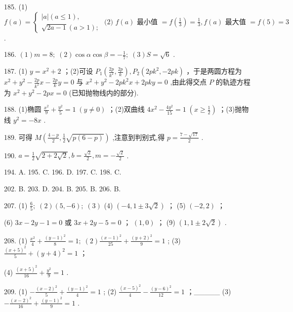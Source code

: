 \documentclass[10pt]{article}
\begin{document}
185. (1) \(f\left( a\right)  = \left\{  {\begin{array}{l} \left| a\right| \left( {a \leq  1}\right) , \\  \sqrt{{2a} - 1}\left( {a > 1}\right) ; \end{array}\text{ (2) }f\left( a\right) \text{ 最小值 } = f\left( \frac{1}{3}\right)  = \frac{1}{3},f\left( a\right) \text{ 最大值 } = f\left( 5\right)  = 3}\right.\) .

186. \(\left( 1\right) m = 8;\;\left( 2\right) \cos \alpha \cos \beta  =  - \frac{1}{7};\;\left( 3\right) S = \sqrt{6}\) .

187. (1) \(y = {x}^{2} + 2\) ；(2)可设 \({P}_{1}\left( {\frac{2p}{{k}^{2}},\frac{2p}{k}}\right) ,{P}_{2}\left( {{2p}{k}^{2}, - {2pk}}\right)\) ，于是两圆方程为 \({x}^{2} + {y}^{2} - \frac{2p}{{k}^{2}}x - \frac{2p}{k}y = 0\) 与 \({x}^{2} + {y}^{2} - {2p}{k}^{2}x + {2pky} = 0\) ,由此得交点 \(P\) 的轨迹方程为 \({x}^{2} + {y}^{2} - {2px} = 0\) (已知抛物线内的部分).

188. (1)椭圆 \(\frac{{x}^{2}}{9} + \frac{{y}^{2}}{5} = 1\;\left( {y \neq  0}\right)\) ；(2)双曲线 \(4{x}^{2} - \frac{4{y}^{2}}{15} = 1\;\left( {x \geq  \frac{1}{2}}\right)\) ；(3)抛物线 \({y}^{2} =  - {8x}\) .

189. 可得 \(M\left( {\frac{4 - p}{2},\frac{1}{2}\sqrt{p\left( {6 - p}\right) }}\right)\) ,注意到判别式,得 \(p = \frac{7 - \sqrt{17}}{2}\) .

190. \(a = \frac{1}{2}\sqrt{2 + 2\sqrt{2}},b = \frac{\sqrt{2}}{2},m =  - \frac{\sqrt{2}}{2}\) .

194. A. 195. C. 196. D. 197. C. 198. C.

202. B. 203. D. 204. B. 205. B. 206. B.

207. (1) \(\frac{6}{5};\;\left( 2\right) \left( {5, - 6}\right) ;\;\left( 3\right)\) (4) \(\left( {-4,1 \pm  3\sqrt{2}}\right)\) ； (5) \(\left( {-2,2}\right)\) ；

(6) \({3x} - {2y} - 1 = 0\) 或 \({3x} + {2y} - 5 = 0\) ； \(\left( {1,0}\right)\) ； (9) \(\left( {1,1 \pm  2\sqrt{2}}\right)\) .

208. (1) \(\frac{{x}^{2}}{4} + \frac{{\left( y - 1\right) }^{2}}{8} = 1;\;\left( 2\right) \frac{{\left( x - 1\right) }^{2}}{25} + \frac{{\left( y + 2\right) }^{2}}{9} = 1\) ; (3) \(\frac{{\left( x + 5\right) }^{2}}{5} + {\left( y + 4\right) }^{2} = 1\) ；

(4) \(\frac{{\left( x + 5\right) }^{2}}{16} + \frac{{y}^{2}}{9} = 1\) .

209. (1) \(- \frac{{\left( x - 2\right) }^{2}}{5} + \frac{{\left( y - 1\right) }^{2}}{4} = 1\) ; (2) \(\frac{{\left( x - 5\right) }^{2}}{4} - \frac{{\left( y - 6\right) }^{2}}{12} = 1\) ；\_\_\_\_\_ (3) \(- \frac{{\left( x - 2\right) }^{2}}{16} + \frac{{\left( y - 1\right) }^{2}}{9} = 1\) .
\end{document}
